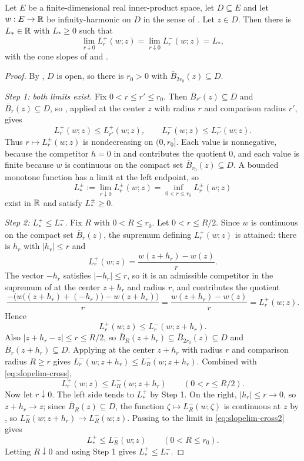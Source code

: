\begin{lemma}
Let $E$ be a finite-dimensional real inner-product space, let $D\subseteq E$ and
let $w:E\to\mathbb{R}$ be infinity-harmonic on $D$ in the sense of
. Let $z\in D$. Then there is $L_*\in\mathbb{R}$ with
$L_*\ge0$ such that
\[
  \lim_{r\downarrow0}L_r^+(w;z)=\lim_{r\downarrow0}L_r^-(w;z)=L_* ,
\]
with the cone slopes of  and
.
\end{lemma}
\begin{proof}
By , $D$ is open, so there is $r_0>0$ with
$\overline B_{2r_0}(z)\subseteq D$.

\emph{Step 1: both limits exist.}
Fix $0<r\le r'\le r_0$. Then $\overline B_{r'}(z)\subseteq D$ and
$\overline B_r(z)\subseteq D$, so , applied at the center
$z$ with radius $r$ and comparison radius $r'$, gives
\[
  L_r^+(w;z)\le L_{r'}^+(w;z),\qquad L_r^-(w;z)\le L_{r'}^-(w;z).
\]
Thus $r\mapsto L_r^\pm(w;z)$ is nondecreasing on $(0,r_0]$. Each value is
nonnegative, because the competitor $h=0$ in  and
 contributes the quotient $0$, and each value is finite
because $w$ is continuous on the compact set $\overline B_{r_0}(z)\subseteq D$.
A bounded monotone function has a limit at the left endpoint, so
\[
  L_*^\pm:=\lim_{r\downarrow0}L_r^\pm(w;z)
       =\inf_{0<r\le r_0}L_r^\pm(w;z)
\]
exist in $\mathbb{R}$ and satisfy $L_*^\pm\ge0$.

\emph{Step 2: $L_*^+\le L_*^-$.}
Fix $R$ with $0<R\le r_0$. Let $0<r\le R/2$. Since $w$ is continuous on the
compact set $\overline B_r(z)$, the supremum defining $L_r^+(w;z)$ is attained:
there is $h_r$ with $|h_r|\le r$ and
\[
  L_r^+(w;z)=\frac{w(z+h_r)-w(z)}{r}.
\]
The vector $-h_r$ satisfies $|-h_r|\le r$, so it is an admissible competitor in
the supremum of  at the center $z+h_r$ and radius $r$,
and contributes the quotient
\[
  \frac{-\bigl(w\bigl((z+h_r)+(-h_r)\bigr)-w(z+h_r)\bigr)}{r}
   =\frac{w(z+h_r)-w(z)}{r}=L_r^+(w;z).
\]
Hence
\begin{equation}\label{eq:slopelim-cross}
  L_r^+(w;z)\le L_r^-(w;z+h_r).
\end{equation}
Also $|z+h_r-z|\le r\le R/2$, so
$\overline B_R(z+h_r)\subseteq\overline B_{2r_0}(z)\subseteq D$ and
$\overline B_r(z+h_r)\subseteq D$. Applying  at the
center $z+h_r$ with radius $r$ and comparison radius $R\ge r$ gives
$L_r^-(w;z+h_r)\le L_R^-(w;z+h_r)$. Combined with
\eqref{eq:slopelim-cross},
\begin{equation}\label{eq:slopelim-cross2}
  L_r^+(w;z)\le L_R^-(w;z+h_r)\qquad(0<r\le R/2).
\end{equation}
Now let $r\downarrow0$. The left side tends to $L_*^+$ by Step 1. On the right,
$|h_r|\le r\to0$, so $z+h_r\to z$; since $\overline B_R(z)\subseteq D$, the
function $\zeta\mapsto L_R^-(w;\zeta)$ is continuous at $z$ by
, so $L_R^-(w;z+h_r)\to L_R^-(w;z)$.
Passing to the limit in \eqref{eq:slopelim-cross2} gives
\[
  L_*^+\le L_R^-(w;z)\qquad(0<R\le r_0).
\]
Letting $R\downarrow0$ and using Step 1 gives $L_*^+\le L_*^-$.


\end{proof}
